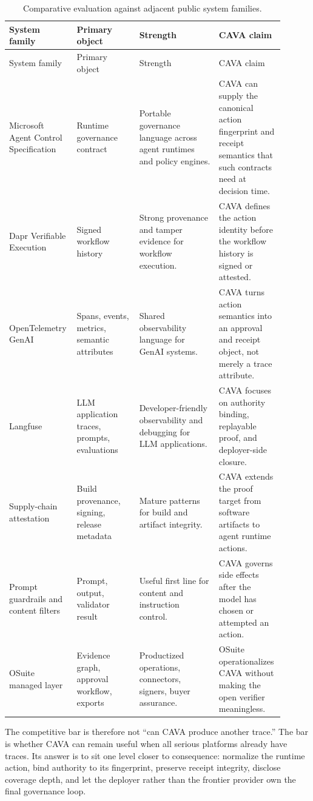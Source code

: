 \documentclass[11pt]{article}
\begin{document}
\begin{longtable}{@{}L{0.20\linewidth}L{0.22\linewidth}L{0.28\linewidth}L{0.20\linewidth}@{}}
\caption{Comparative evaluation against adjacent public system families.}
\label{tab:comparative-evaluation}\\
\toprule
System family & Primary object & Strength & CAVA claim \\
\midrule
\endfirsthead
\toprule
System family & Primary object & Strength & CAVA claim \\
\midrule
\endhead
Microsoft Agent Control Specification \citep{microsoftacs2026} & Runtime governance contract & Portable governance language across agent runtimes and policy engines. & CAVA can supply the canonical action fingerprint and receipt semantics that such contracts need at decision time. \\
Dapr Verifiable Execution \citep{daprverifiable2026} & Signed workflow history & Strong provenance and tamper evidence for workflow execution. & CAVA defines the action identity before the workflow history is signed or attested. \\
OpenTelemetry GenAI \citep{otelgenai2026} & Spans, events, metrics, semantic attributes & Shared observability language for GenAI systems. & CAVA turns action semantics into an approval and receipt object, not merely a trace attribute. \\
Langfuse \citep{langfuseobservability} & LLM application traces, prompts, evaluations & Developer-friendly observability and debugging for LLM applications. & CAVA focuses on authority binding, replayable proof, and deployer-side closure. \\
Supply-chain attestation & Build provenance, signing, release metadata & Mature patterns for build and artifact integrity. & CAVA extends the proof target from software artifacts to agent runtime actions. \\
Prompt guardrails and content filters & Prompt, output, validator result & Useful first line for content and instruction control. & CAVA governs side effects after the model has chosen or attempted an action. \\
OSuite managed layer & Evidence graph, approval workflow, exports & Productized operations, connectors, signers, buyer assurance. & OSuite operationalizes CAVA without making the open verifier meaningless. \\
\bottomrule
\end{longtable}

The competitive bar is therefore not ``can CAVA produce another trace.'' The bar is whether CAVA can remain useful when all serious platforms already have traces. Its answer is to sit one level closer to consequence: normalize the runtime action, bind authority to its fingerprint, preserve receipt integrity, disclose coverage depth, and let the deployer rather than the frontier provider own the final governance loop.
\end{document}
